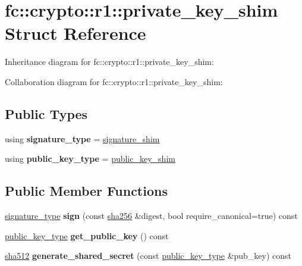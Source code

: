 \hypertarget{structfc_1_1crypto_1_1r1_1_1private__key__shim}{}\section{fc\+:\+:crypto\+:\+:r1\+:\+:private\+\_\+key\+\_\+shim Struct Reference}
\label{structfc_1_1crypto_1_1r1_1_1private__key__shim}


Inheritance diagram for fc\+:\+:crypto\+:\+:r1\+:\+:private\+\_\+key\+\_\+shim\+:


Collaboration diagram for fc\+:\+:crypto\+:\+:r1\+:\+:private\+\_\+key\+\_\+shim\+:
\subsection*{Public Types}
\begin{DoxyCompactItemize}
\item 
\mbox{\label{structfc_1_1crypto_1_1r1_1_1private__key__shim_a673810ed7aa110c64872bf4cb709fc10}} 
using {\bfseries signature\+\_\+type} = \mbox{\hyperlink{structfc_1_1crypto_1_1r1_1_1signature__shim}{signature\+\_\+shim}}
\item 
\mbox{\label{structfc_1_1crypto_1_1r1_1_1private__key__shim_a62620b14e3da00e0434862258b184b9f}} 
using {\bfseries public\+\_\+key\+\_\+type} = \mbox{\hyperlink{structfc_1_1crypto_1_1r1_1_1public__key__shim}{public\+\_\+key\+\_\+shim}}
\end{DoxyCompactItemize}
\subsection*{Public Member Functions}
\begin{DoxyCompactItemize}
\item 
\mbox{\label{structfc_1_1crypto_1_1r1_1_1private__key__shim_abc672592c4cb60b767b08c0f683917c9}} 
\mbox{\hyperlink{structfc_1_1crypto_1_1r1_1_1signature__shim}{signature\+\_\+type}} {\bfseries sign} (const \mbox{\hyperlink{classfc_1_1sha256}{sha256}} \&digest, bool require\+\_\+canonical=true) const
\item 
\mbox{\label{structfc_1_1crypto_1_1r1_1_1private__key__shim_a6d673533b99deec7cc62ee5126575ebb}} 
\mbox{\hyperlink{structfc_1_1crypto_1_1r1_1_1public__key__shim}{public\+\_\+key\+\_\+type}} {\bfseries get\+\_\+public\+\_\+key} () const
\item 
\mbox{\label{structfc_1_1crypto_1_1r1_1_1private__key__shim_af917161201febd5585723170e11b4a68}} 
\mbox{\hyperlink{classfc_1_1sha512}{sha512}} {\bfseries generate\+\_\+shared\+\_\+secret} (const \mbox{\hyperlink{structfc_1_1crypto_1_1r1_1_1public__key__shim}{public\+\_\+key\+\_\+type}} \&pub\+\_\+key) const
\end{DoxyCompactItemize}
